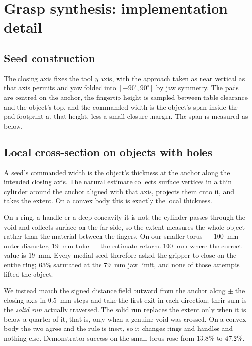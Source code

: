 \section{Grasp synthesis: implementation detail}
\label{app:synth}

\subsection{Seed construction}
\label{app:synth:seeds}
The closing axis fixes the tool $y$ axis, with the approach taken as near vertical as that axis
permits and yaw folded into $[-90^\circ,90^\circ]$ by jaw symmetry. The pads are centred on the
anchor, the fingertip height is sampled between table clearance and the object's top, and the
commanded width is the object's span inside the pad footprint at that height, less a small closure
margin. The span is measured as below.

\subsection{Local cross-section on objects with holes}
\label{app:synth:width}
A seed's commanded width is the object's thickness at the anchor along the intended closing axis.
The natural estimate collects surface vertices in a thin cylinder around the anchor aligned with
that axis, projects them onto it, and takes the extent. On a convex body this is exactly the local
thickness.

On a ring, a handle or a deep concavity it is not: the cylinder passes through the void and
collects surface on the far side, so the extent measures the whole object rather than the material
between the fingers. On our smaller torus --- $100$~mm outer diameter, $19$~mm tube --- the
estimate returns $100$~mm where the correct value is $19$~mm. Every medial seed therefore asked the
gripper to close on the entire ring; $63\%$ saturated at the $79$~mm jaw limit, and none of those
attempts lifted the object.

We instead march the signed distance field outward from the anchor along $\pm$ the closing axis in
$0.5$~mm steps and take the first exit in each direction; their sum is the \emph{solid run}
actually traversed. The solid run replaces the extent only when it is below a quarter of it, that
is, only when a genuine void was crossed. On a convex body the two agree and the rule is inert, so
it changes rings and handles and nothing else. Demonstrator success on the small torus rose from
$13.8\%$ to $47.2\%$.

